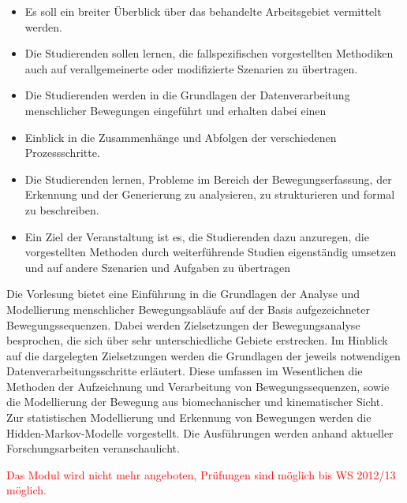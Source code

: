 \begin{module}
\begin{learningoutcomes}
\begin{itemize}\item Es soll ein breiter Überblick über das behandelte Arbeitsgebiet vermittelt werden.  \item Die Studierenden sollen lernen, die fallspezifischen vorgestellten Methodiken auch auf verallgemeinerte oder modifizierte Szenarien zu übertragen.  \item Die Studierenden werden in die Grundlagen der Datenverarbeitung menschlicher Bewegungen eingeführt und erhalten dabei einen  \item Einblick in die Zusammenhänge und Abfolgen der verschiedenen Prozessschritte.  \item Die Studierenden lernen, Probleme im Bereich der Bewegungserfassung, der Erkennung und der Generierung zu analysieren, zu strukturieren und formal zu beschreiben.  \item Ein Ziel der Veranstaltung ist es, die Studierenden dazu anzuregen, die vorgestellten Methoden durch weiterführende Studien eigenständig umsetzen und auf andere Szenarien und Aufgaben zu übertragen  \end{itemize}
\end{learningoutcomes}

\begin{content}
Die Vorlesung bietet eine Einführung in die Grundlagen der Analyse und Modellierung menschlicher Bewegungsabläufe auf der Basis aufgezeichneter Bewegungssequenzen. Dabei werden Zielsetzungen der Bewegungsanalyse besprochen, die sich über sehr unterschiedliche Gebiete erstrecken. Im Hinblick auf die dargelegten Zielsetzungen werden die Grundlagen der jeweils notwendigen Datenverarbeitungsschritte erläutert. Diese umfassen im Wesentlichen die Methoden der Aufzeichnung und Verarbeitung von Bewegungssequenzen, sowie die Modellierung der Bewegung aus biomechanischer und kinematischer Sicht. Zur statistischen Modellierung und Erkennung von Bewegungen werden die Hidden-Markov-Modelle vorgestellt. Die Ausführungen werden anhand aktueller Forschungsarbeiten veranschaulicht.


\end{content}

\begin{remarks}\textcolor{red}{Das Modul wird nicht mehr angeboten, Prüfungen sind möglich bis WS 2012/13 möglich.}

\end{remarks}

\end{module}

